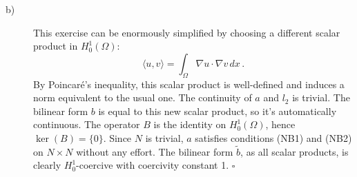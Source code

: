 \documentclass[a4paper]{article}
\newcommand{\dx}{\, dx \,}
\begin{document}
\begin{description}
\item[b)] This exercise can be enormously simplified by choosing a different
	scalar product in $H^1_0(\Omega)$:
	\[
	\langle u,v \rangle = \int_\Omega \nabla u \cdot \nabla v \dx.
	\]
	By Poincaré's inequality, this scalar product is well-defined and induces
	a norm equivalent to the usual one.
	The continuity of $a$ and $l_2$ is trivial. The bilinear form $b$ is equal
	to this new scalar product, so it's automatically continuous.
	The operator $B$ is the identity on $H^1_0(\Omega)$, hence $\ker(B) = \{0\}$.
	Since $N$ is trivial, $a$ satisfies conditions (NB1)	and (NB2) on $N \times N$
	without any effort. The bilinear form $\tilde{b}$, as all scalar products,
	is clearly $H^1_0$-coercive with coercivity constant 1. $\square$
\end{description}
\end{document}
